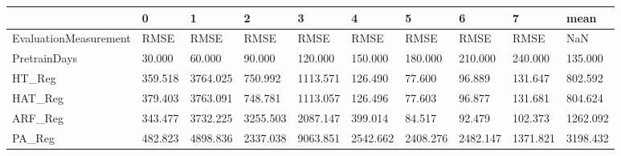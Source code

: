\begin{tabular}{llllllllll}
\toprule
{} &       0 &        1 &        2 &        3 &        4 &        5 &        6 &        7 &     mean \\
\midrule
EvaluationMeasurement &    RMSE &     RMSE &     RMSE &     RMSE &     RMSE &     RMSE &     RMSE &     RMSE &      NaN \\
PretrainDays          &  30.000 &   60.000 &   90.000 &  120.000 &  150.000 &  180.000 &  210.000 &  240.000 &  135.000 \\
HT\_Reg                & 359.518 & 3764.025 &  750.992 & 1113.571 &  126.490 &   77.600 &   96.889 &  131.647 &  802.592 \\
HAT\_Reg               & 379.403 & 3763.091 &  748.781 & 1113.057 &  126.496 &   77.603 &   96.877 &  131.681 &  804.624 \\
ARF\_Reg               & 343.477 & 3732.225 & 3255.503 & 2087.147 &  399.014 &   84.517 &   92.479 &  102.373 & 1262.092 \\
PA\_Reg                & 482.823 & 4898.836 & 2337.038 & 9063.851 & 2542.662 & 2408.276 & 2482.147 & 1371.821 & 3198.432 \\
\bottomrule
\end{tabular}
